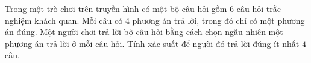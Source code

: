 \begin{ex}%
	Trong một trò chơi trên truyền hình có một bộ câu hỏi gồm $6$ câu hỏi trắc nghiệm khách quan. Mỗi câu có $4$ phương án trả lời, trong đó chỉ có một phương án đúng. Một người chơi trả lời bộ câu hỏi bằng cách chọn ngẫu nhiên một phương án trả lời ở mỗi câu hỏi. Tính xác suất để người đó trả lời đúng ít nhất $4$ câu.
\end{ex}

